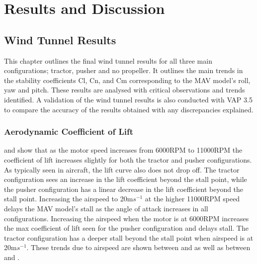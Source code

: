 \graphicspath{{./Figs/}}

\chapter{Results and Discussion} 

\section{Wind Tunnel Results}
This chapter outlines the final wind tunnel results for all three main configurations; tractor, pusher and no propeller. It outlines the main trends in the stability coefficients Cl, Cn, and Cm corresponding to the MAV model's roll, yaw and pitch. These results are analysed with critical observations and trends identified. A validation of the wind tunnel results is also conducted with VAP 3.5 to compare the accuracy of the results obtained with any discrepancies explained.


\subsection{Aerodynamic Coefficient of Lift}
 and  show that as the motor speed increases from 6000RPM to 11000RPM the coefficient of lift increases slightly for both the tractor and pusher configurations. As typically seen in aircraft, the lift curve also does not drop off. The tractor configuration sees an increase in the lift coefficient beyond the stall point, while the pusher configuration has a linear decrease in the lift coefficient beyond the stall point. Increasing the airspeed to 20m$s^{-1}$ at the higher 11000RPM speed delays the MAV model's stall as the angle of attack increases in all configurations. Increasing the airspeed when the motor is at 6000RPM increases the max coefficient of lift seen for the pusher configuration  and delays stall. The tractor configuration has a deeper stall beyond the stall point when airspeed is at 20m$s^{-1}$. These trends due to airspeed are shown between  and  as well as between  and .

